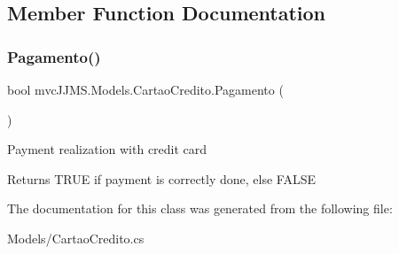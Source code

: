 \subsection{Member Function Documentation}
\mbox{\label{classmvc_j_j_m_s_1_1_models_1_1_cartao_credito_ab5535ad2253ef9ed12be8109615de9af}} 
\subsubsection{\texorpdfstring{Pagamento()}{Pagamento()}}
{\footnotesize\ttfamily bool mvc\+J\+J\+M\+S.\+Models.\+Cartao\+Credito.\+Pagamento (\begin{DoxyParamCaption}{ }\end{DoxyParamCaption})\hspace{0.3cm}{\ttfamily [inline]}}



Payment realization with credit card 

\begin{DoxyReturn}{Returns}
T\+R\+UE if payment is correctly done, else F\+A\+L\+SE
\end{DoxyReturn}


The documentation for this class was generated from the following file\+:\begin{DoxyCompactItemize}
\item 
Models/Cartao\+Credito.\+cs\end{DoxyCompactItemize}
